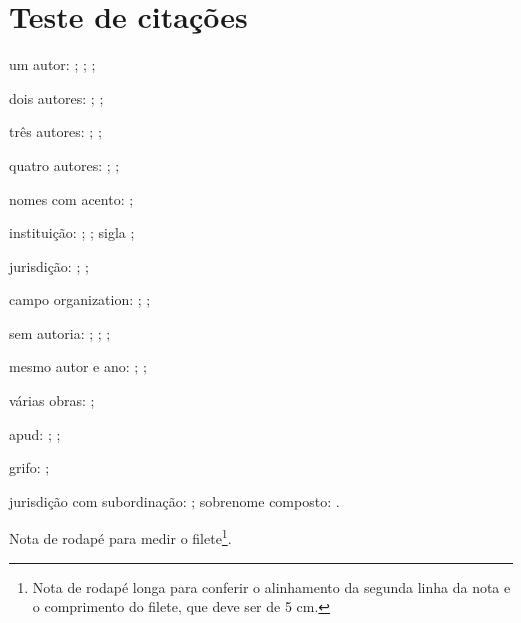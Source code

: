\documentclass[a4paper,12pt,chapter=TITLE,section=Title,subsection=Title,oneside,english,spanish,brazil]{lib/abntex2}
\begin{document}
\textual
\chapter{Teste de citações}
\begin{alineas}
\item um autor: \cite{um}; ; \cite[p.~5]{um};
\item dois autores: \cite{dois}; ;
\item três autores: \cite{tres}; ;
\item quatro autores: \cite{quatro}; ;
\item nomes com acento: \cite{acento};
\item instituição: \cite{inst}; ; sigla \cite{sigla};
\item jurisdição: \cite{gov}; ;
\item campo organization: \cite{org}; ;
\item sem autoria: \cite{semautor}; \cite{artigo}; \cite{umapalavra};
\item mesmo autor e ano: \cite{reeA}; \cite{reeB};
\item várias obras: \cite{um,tres,inst};
\item apud: ; ;
\item grifo: \cite[p.~5, grifo nosso]{um};
\item jurisdição com subordinação: \cite{sp}; sobrenome composto: \cite{souza}.
\end{alineas}
Nota de rodapé para medir o filete\footnote{Nota de rodapé longa para conferir o alinhamento da segunda linha da nota e o comprimento do filete, que deve ser de 5 cm.}.
\nocite{online,art,diss,avila,zeca,sp,souza}

\end{document}
